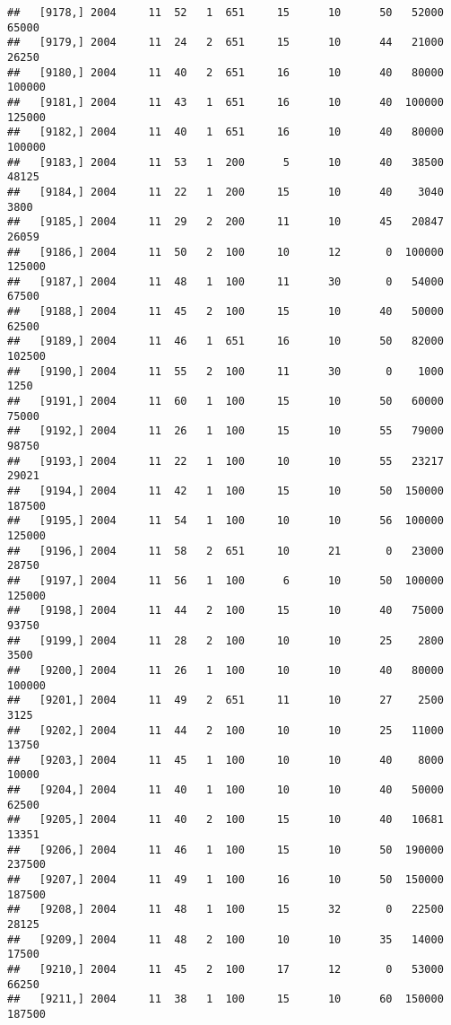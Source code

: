 \documentclass{article}\usepackage[]{graphicx}\usepackage[]{color}
\makeatletter
\newenvironment{kframe}{%
 \def\at@end@of@kframe{}%
 \ifinner\ifhmode%
  \def\at@end@of@kframe{\end{minipage}}%
  \begin{minipage}{\columnwidth}%
 \fi\fi%
 \def\FrameCommand##1{\hskip\@totalleftmargin \hskip-\fboxsep
 \colorbox{shadecolor}{##1}\hskip-\fboxsep
     \hskip-\linewidth \hskip-\@totalleftmargin \hskip\columnwidth}%
 \MakeFramed {\advance\hsize-\width
   \@totalleftmargin\z@ \linewidth\hsize
   \@setminipage}}%
 {\par\unskip\endMakeFramed%
 \at@end@of@kframe}
\newenvironment{knitrout}{}{} %
\makeatother
\begin{document}
\begin{knitrout}
\begin{kframe}
\begin{verbatim}
##   [9178,] 2004     11  52   1  651     15      10      50   52000   65000
##   [9179,] 2004     11  24   2  651     15      10      44   21000   26250
##   [9180,] 2004     11  40   2  651     16      10      40   80000  100000
##   [9181,] 2004     11  43   1  651     16      10      40  100000  125000
##   [9182,] 2004     11  40   1  651     16      10      40   80000  100000
##   [9183,] 2004     11  53   1  200      5      10      40   38500   48125
##   [9184,] 2004     11  22   1  200     15      10      40    3040    3800
##   [9185,] 2004     11  29   2  200     11      10      45   20847   26059
##   [9186,] 2004     11  50   2  100     10      12       0  100000  125000
##   [9187,] 2004     11  48   1  100     11      30       0   54000   67500
##   [9188,] 2004     11  45   2  100     15      10      40   50000   62500
##   [9189,] 2004     11  46   1  651     16      10      50   82000  102500
##   [9190,] 2004     11  55   2  100     11      30       0    1000    1250
##   [9191,] 2004     11  60   1  100     15      10      50   60000   75000
##   [9192,] 2004     11  26   1  100     15      10      55   79000   98750
##   [9193,] 2004     11  22   1  100     10      10      55   23217   29021
##   [9194,] 2004     11  42   1  100     15      10      50  150000  187500
##   [9195,] 2004     11  54   1  100     10      10      56  100000  125000
##   [9196,] 2004     11  58   2  651     10      21       0   23000   28750
##   [9197,] 2004     11  56   1  100      6      10      50  100000  125000
##   [9198,] 2004     11  44   2  100     15      10      40   75000   93750
##   [9199,] 2004     11  28   2  100     10      10      25    2800    3500
##   [9200,] 2004     11  26   1  100     10      10      40   80000  100000
##   [9201,] 2004     11  49   2  651     11      10      27    2500    3125
##   [9202,] 2004     11  44   2  100     10      10      25   11000   13750
##   [9203,] 2004     11  45   1  100     10      10      40    8000   10000
##   [9204,] 2004     11  40   1  100     10      10      40   50000   62500
##   [9205,] 2004     11  40   2  100     15      10      40   10681   13351
##   [9206,] 2004     11  46   1  100     15      10      50  190000  237500
##   [9207,] 2004     11  49   1  100     16      10      50  150000  187500
##   [9208,] 2004     11  48   1  100     15      32       0   22500   28125
##   [9209,] 2004     11  48   2  100     10      10      35   14000   17500
##   [9210,] 2004     11  45   2  100     17      12       0   53000   66250
##   [9211,] 2004     11  38   1  100     15      10      60  150000  187500

\end{verbatim}
\end{kframe}
\end{knitrout}
\end{document}
